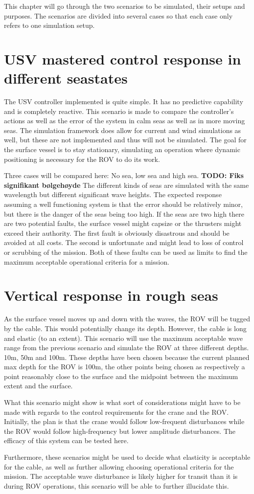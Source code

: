\documentclass[class=article, crop=false, draft=true]{standalone}
\begin{document}
This chapter will go through the two scenarios to be simulated, their setups and purposes. The scenarios are divided into several cases so that each case only refers to one simulation setup.

\section{USV mastered control response in different seastates}
The USV controller implemented is quite simple. It has no predictive capability and is completely reactive. This scenario is made to compare the controller's actions as well as the error of the system in calm seas as well as in more moving seas. The simulation framework does allow for current and wind simulations as well, but these are not implemented and thus will not be simulated. The goal for the surface vessel is to stay stationary, simulating an operation where dynamic positioning is necessary for the ROV to do its work.

Three cases will be compared here: No sea, low sea and high sea. \textbf{TODO: Fiks signifikant bølgehøyde} The different kinds of seas are simulated with the same wavelength but different significant wave heights. The expected response assuming a well functioning system is that the error should be relatively minor, but there is the danger of the seas being too high. If the seas are two high there are two potential faults, the surface vessel might capsize or the thrusters might exceed their authority. The first fault is obviously disastrous and should be avoided at all costs. The second is unfortunate and might lead to loss of control or scrubbing of the mission. Both of these faults can be used as limits to find the maximum acceptable operational criteria for a mission.

\section{Vertical response in rough seas}
As the surface vessel moves up and down with the waves, the ROV will be tugged by the cable. This would potentially change its depth. However, the cable is long and elastic (to an extent). This scenario will use the maximum acceptable wave range from the previous scenario and simulate the ROV at three different depths. 10m, 50m and 100m. These depths have been chosen because the current planned max depth for the ROV is 100m, the other points being chosen as respectively a point reasonably close to the surface and the midpoint between the maximum extent and the surface.

What this scenario might show is what sort of considerations might have to be made with regards to the control requirements for the crane and the ROV. Initially, the plan is that the crane would follow low-frequent disturbances while the ROV would follow high-frequency but lower amplitude disturbances. The efficacy of this system can be tested here.

Furthermore, these scenarios might be used to decide what elasticity is acceptable for the cable, as well as further allowing choosing operational criteria for the mission. The acceptable wave disturbance is likely higher for transit than it is during ROV operations, this scenario will be able to further illucidate this.
\end{document}
